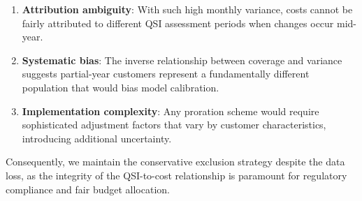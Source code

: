 \begin{enumerate}
    \item \textbf{Attribution ambiguity}: With such high monthly variance, costs cannot be fairly attributed to different QSI assessment periods when changes occur mid-year.
    
    \item \textbf{Systematic bias}: The inverse relationship between coverage and variance suggests partial-year customers represent a fundamentally different population that would bias model calibration.
    
    \item \textbf{Implementation complexity}: Any proration scheme would require sophisticated adjustment factors that vary by customer characteristics, introducing additional uncertainty.
\end{enumerate}

Consequently, we maintain the conservative exclusion strategy despite the data loss, as the integrity of the QSI-to-cost relationship is paramount for regulatory compliance and fair budget allocation.
